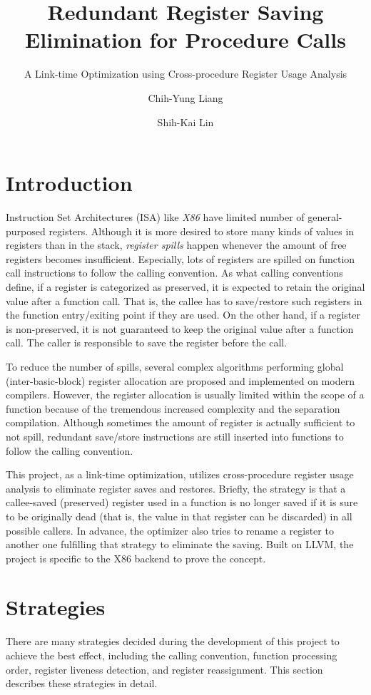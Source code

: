 \documentclass[acmsmall]{acmart}
\title{Redundant Register Saving Elimination for Procedure Calls}
\subtitle{A Link-time Optimization using Cross-procedure Register Usage Analysis}
\author{Chih-Yung Liang}
\affiliation{
	\institution{National Taiwan University}
	\department{Institute of Networking and Multimedia}
}
\author{Shih-Kai Lin}
\affiliation{
	\institution{National Taiwan University}
	\department{Department of Computer Science and Information Engineering}
}
\begin{document}
\maketitle

\section{Introduction}
Instruction Set Architectures (ISA) like \textit{X86} have limited number of general-purposed registers. Although it is more desired to store many kinds of values in registers than in the stack, \textit{register spills} happen whenever the amount of free registers becomes insufficient. Especially, lots of registers are spilled on function call instructions to follow the calling convention. As what calling conventions define, if a register is categorized as preserved, it is expected to retain the original value after a function call. That is, the callee has to save/restore such registers in the function entry/exiting point if they are used. On the other hand, if a register is non-preserved, it is not guaranteed to keep the original value after a function call. The caller is responsible to save the register before the call.

To reduce the number of spills, several complex algorithms performing global (inter-basic-block) register allocation are proposed and implemented on modern compilers. However, the register allocation is usually limited within the scope of a function because of the tremendous increased complexity and the separation compilation. Although sometimes the amount of register is actually sufficient to not spill, redundant save/store instructions are still inserted into functions to follow the calling convention.

This project, as a link-time optimization, utilizes cross-procedure register usage analysis to eliminate register saves and restores. Briefly, the strategy is that a callee-saved (preserved) register used in a function is no longer saved if it is sure to be originally dead (that is, the value in that register can be discarded) in all possible callers. In advance, the optimizer also tries to rename a register to another one fulfilling that strategy to eliminate the saving. Built on LLVM, the project is specific to the X86 backend to prove the concept.

\section{Strategies}
\label{sec:strategy}
There are many strategies decided during the development of this project to achieve the best effect, including the calling convention, function processing order, register liveness detection, and register reassignment. This section describes these strategies in detail.
\end{document}
